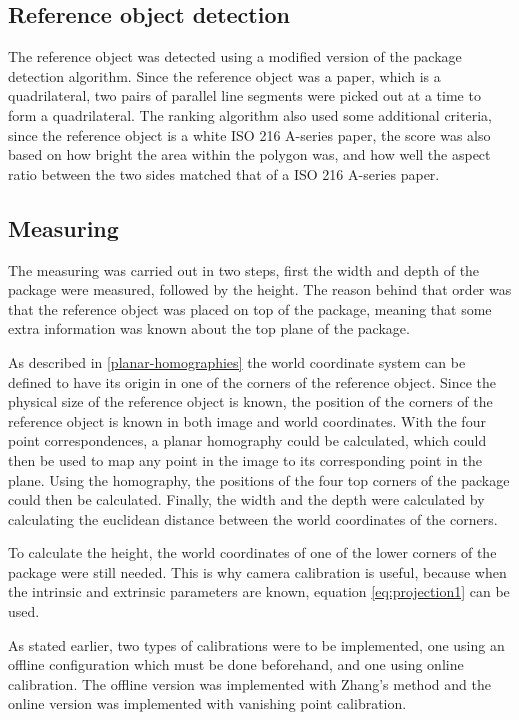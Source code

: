 \subsection{Reference object detection} \label{method:reference_object_detection}
The reference object was detected using a modified version of the package detection algorithm.
Since the reference object was a paper, which is a quadrilateral, two pairs of parallel line segments were picked out at a time to form a quadrilateral.
The ranking algorithm also used some additional criteria, since the reference object is a white ISO 216 A-series  paper, the score was also based on how bright the area within the polygon was, and how well the aspect ratio between the two sides matched that of a ISO 216 A-series paper.

\subsection{Measuring} \label{method:measuring} %
The measuring was carried out in two steps, first the width and depth of the package were measured, followed by the height. 
The reason behind that order was that the reference object was placed on top of the package, meaning that some extra information was known about the  top plane of the package.

As described in \ref{planar-homographies} the world coordinate system can be defined to have its origin in one of the corners of the reference object.
Since the physical size of the reference object is known, the position of the corners of the reference object is known in both image and world coordinates.
With the four point correspondences, a planar homography could be calculated, which could then be used to map any point in the image to its corresponding point in the plane.
Using the homography, the positions of the four top corners of the package could then be calculated. 
Finally, the width and the depth were calculated by calculating the euclidean distance between the world coordinates of the corners.

To calculate the height, the world coordinates of one of the lower corners of the package were still needed.
This is why camera calibration is useful, because when the intrinsic and extrinsic parameters are known, equation \ref{eq:projection1} can be used.

As stated earlier, two types of calibrations were to be implemented, one using an offline configuration which must be done beforehand, and one using online calibration.
The offline version was implemented with Zhang's method and the online version was implemented with vanishing point calibration.

